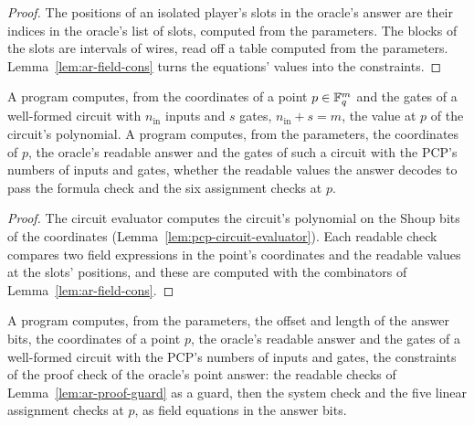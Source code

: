 \begin{proof}
\leanok
The positions of an isolated player's slots in the oracle's answer are their indices in the
oracle's list of slots, computed from the parameters. The blocks of the slots are intervals of
wires, read off a table computed from the parameters. Lemma~\ref{lem:ar-field-cons} turns the
equations' values into the constraints.
\end{proof}

\begin{lemma}
\label{lem:ar-proof-guard}
\leanok
A program computes, from the coordinates of a point $p \in \mathbb{F}_q^m$ and the gates of a
well-formed circuit with $n_{\mathrm{in}}$ inputs and $s$ gates, $n_{\mathrm{in}} + s = m$, the
value at $p$ of the circuit's polynomial. A program computes, from the parameters, the
coordinates of $p$, the oracle's readable answer and the gates of such a circuit with the PCP's
numbers of inputs and gates, whether the readable values the answer decodes to pass the formula
check and the six assignment checks at $p$.
\end{lemma}

\begin{proof}
\leanok
The circuit evaluator computes the circuit's polynomial on the Shoup bits of the coordinates
(Lemma~\ref{lem:pcp-circuit-evaluator}). Each readable check compares two field expressions in
the point's coordinates and the readable values at the slots' positions, and these are computed
with the combinators of Lemma~\ref{lem:ar-field-cons}.
\end{proof}

\begin{lemma}
\label{lem:ar-proof-eqs}
\leanok
A program computes, from the parameters, the offset and length of the answer bits, the
coordinates of a point $p$, the oracle's readable answer and the gates of a well-formed circuit
with the PCP's numbers of inputs and gates, the constraints of the proof check of the oracle's
point answer: the readable checks of Lemma~\ref{lem:ar-proof-guard} as a guard, then the system
check and the five linear assignment checks at $p$, as field equations in the answer bits.
\end{lemma}

